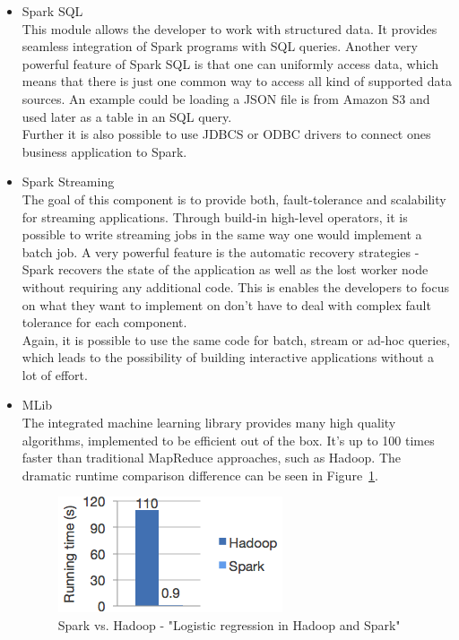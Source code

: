 \begin{itemize}
\item Spark SQL\\
This module allows the developer to work with structured data.
It provides seamless integration of Spark programs with SQL queries.
Another very powerful feature of Spark SQL is that one can uniformly access data, which means that there is just one common way to access all kind of supported data sources.
An example could be loading a JSON file is from Amazon S3 and used later as a table in an SQL query.\\
Further it is also possible to use JDBCS or ODBC drivers to connect ones business application to Spark.

\item Spark Streaming\\
The goal of this component is to provide both, fault-tolerance and scalability for streaming applications.
Through build-in high-level operators, it is possible to write streaming jobs in the same way one would implement a batch job.
A very powerful feature is the automatic recovery strategies - Spark recovers the state of the application as well as the lost worker node without requiring any additional code.
This is enables the developers to focus on what they want to implement on don't have to deal with complex fault tolerance for each component.\\
Again, it is possible to use the same code for batch, stream or ad-hoc queries, which leads to the possibility of building interactive applications without a lot of effort.

\item MLib\\
The integrated machine learning library provides many high quality algorithms, implemented to be efficient out of the box.
It's up to 100 times faster than traditional MapReduce approaches, such as Hadoop.
The dramatic runtime comparison difference can be seen in Figure~\ref{fig:spark_vs_hadoop}.


\begin{figure}[!htbp]
  \centering
  \includegraphics[keepaspectratio=true,scale=0.7]{img/spark_vs_hadoop}
    \caption{Spark vs. Hadoop - "Logistic regression in Hadoop and Spark" \cite{apache_spark}}
  \label{fig:spark_vs_hadoop}
\end{figure}


\end{itemize}
